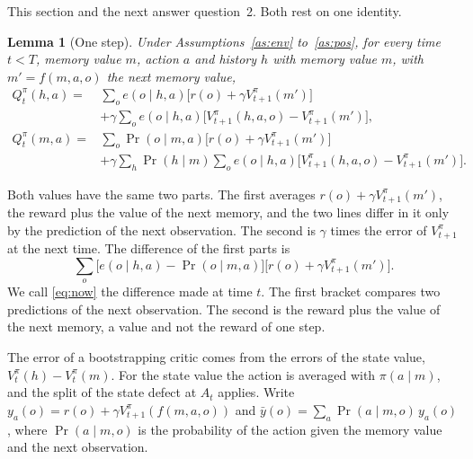 \documentclass{article}
\newtheorem{lemma}[proposition]{Lemma}
\theoremstyle{definition}
\begin{document}
This section and the next answer question~2. Both rest on one identity.

\begin{lemma}[One step]\label{lem:onestep}
Under Assumptions~\ref{as:env} to~\ref{as:pos}, for every time $t<T$, memory value $m$, action $a$ and history $h$ with memory value $m$, with $m'=f(m,a,o)$ the next memory value,
\begin{align}
Q^\pi_t(h,a)={}&\sum_oe(o\mid h,a)\big[r(o)+\gamma V^\pi_{t+1}(m')\big] \nonumber\\
&+\gamma\sum_oe(o\mid h,a)\big[V^\pi_{t+1}(h,a,o)-V^\pi_{t+1}(m')\big], \label{eq:Qh}\\
Q^\pi_t(m,a)={}&\sum_o\Pr(o\mid m,a)\big[r(o)+\gamma V^\pi_{t+1}(m')\big] \nonumber\\
&+\gamma\sum_h\Pr(h\mid m)\sum_oe(o\mid h,a)\big[V^\pi_{t+1}(h,a,o)-V^\pi_{t+1}(m')\big]. \label{eq:Qm}
\end{align}
\end{lemma}

Both values have the same two parts. The first averages $r(o)+\gamma V^\pi_{t+1}(m')$, the reward plus the value of the next memory, and the two lines differ in it only by the prediction of the next observation. The second is $\gamma$ times the error of $V^\pi_{t+1}$ at the next time. The difference of the first parts is
\begin{equation}\label{eq:now}
\sum_o\big[e(o\mid h,a)-\Pr(o\mid m,a)\big]\big[r(o)+\gamma V^\pi_{t+1}(m')\big].
\end{equation}
We call \eqref{eq:now} the difference made at time $t$. The first bracket compares two predictions of the next observation. The second is the reward plus the value of the next memory, a value and not the reward of one step.

The error of a bootstrapping critic comes from the errors of the state value, $V^\pi_t(h)-V^\pi_t(m)$. For the state value the action is averaged with $\pi(a\mid m)$, and the split of the state defect at $A_t$ applies. Write $y_a(o)=r(o)+\gamma V^\pi_{t+1}(f(m,a,o))$ and $\bar y(o)=\sum_a\Pr(a\mid m,o)\,y_a(o)$, where $\Pr(a\mid m,o)$ is the probability of the action given the memory value and the next observation.
\end{document}
